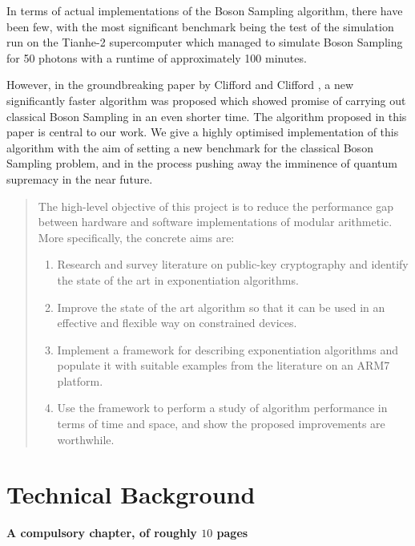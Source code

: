 \documentclass[ %
                    author={Manan Vaswani},
                supervisor={Dr. Raphael Clifford},
                    degree={MEng},
                     title={A multi-core CPU implementation \n of the classical Boson Sampling algorithm},
                  subtitle={},
                      type={},
                      year={2019} ]{dissertation}
\begin{document}
In terms of actual implementations of the Boson Sampling algorithm, there have been few, with the most significant benchmark being the test of the simulation run on the Tianhe-2 supercomputer \cite{wu2018} which managed to simulate Boson Sampling for 50 photons with a runtime of approximately 100 minutes.

However, in the groundbreaking paper by Clifford and Clifford \cite{clifford17}, a new significantly faster algorithm was proposed which showed promise of carrying out classical Boson Sampling in an even shorter time. The algorithm proposed in this paper is central to our work. We give a highly optimised implementation of this algorithm with the aim of setting a new benchmark for the classical Boson Sampling problem, and in the process pushing away the imminence of quantum supremacy in the near future.


\begin{quote}
\noindent
The high-level objective of this project is to reduce the performance 
gap between hardware and software implementations of modular arithmetic.  
More specifically, the concrete aims are:

\begin{enumerate}
\item Research and survey literature on public-key cryptography and
      identify the state of the art in exponentiation algorithms.
\item Improve the state of the art algorithm so that it can be used
      in an effective and flexible way on constrained devices.
\item Implement a framework for describing exponentiation algorithms
      and populate it with suitable examples from the literature on 
      an ARM7 platform.
\item Use the framework to perform a study of algorithm performance
      in terms of time and space, and show the proposed improvements
      are worthwhile.
\end{enumerate}
\end{quote}


\chapter{Technical Background}
\label{chap:technical}

{\bf A compulsory chapter,     of roughly $10$ pages} 
\vspace{1cm} 
\end{document}
